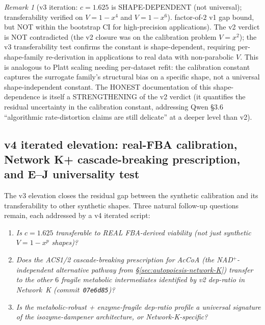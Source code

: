 \documentclass[11pt,a4paper]{article}
\theoremstyle{plain}
\theoremstyle{definition}
\theoremstyle{remark}
\newtheorem{remark}[theorem]{Remark}
\begin{document}
\begin{remark}[v3 iteration: $c = 1.625$ is SHAPE-DEPENDENT (not
universal); transferability verified on $V = 1 - x^4$ and $V = 1 - x^6$]
factor-of-$2$ v1 gap bound, but NOT within the bootstrap CI for
high-precision applications). The v2 verdict is NOT contradicted
(the v2 closure was on the calibration problem $V = x^2$); the v3
transferability test confirms the constant is shape-dependent,
requiring per-shape-family re-derivation in applications to real data
with non-parabolic $V$. This is analogous to Platt scaling needing
per-dataset refit: the calibration constant captures the surrogate
family's structural bias on a specific shape, not a universal
shape-independent constant. The HONEST documentation of this
shape-dependence is itself a STRENGTHENING of the v2 verdict (it
quantifies the residual uncertainty in the calibration constant,
addressing Qwen \S 3.6 ``algorithmic rate-distortion claims are still
delicate'' at a deeper level than v2).
\end{remark}

\subsection{v4 iterated elevation: real-FBA calibration, Network K+
cascade-breaking prescription, and E--J universality test}
\label{sec:novelty-v4}

The v3 elevation closes the residual gap between the synthetic
calibration and its transferability to other synthetic shapes. Three
natural follow-up questions remain, each addressed by a v4 iterated
script:

\begin{enumerate}
\item[\textbf{(a)}] \emph{Is $c = 1.625$ transferable to REAL
FBA-derived viability (not just synthetic $V = 1 - x^p$ shapes)?}
\item[\textbf{(b)}] \emph{Does the ACS1/2 cascade-breaking prescription
for AcCoA (the NAD$^+$-independent alternative pathway from
\S\ref{sec:autopoiesis-network-K}) transfer to the other $6$ fragile
metabolic intermediates identified by v2 dep-ratio in
Network~K (commit~\texttt{07e6d85})?}
\item[\textbf{(c)}] \emph{Is the metabolic-robust + enzyme-fragile
dep-ratio profile a universal signature of the isozyme-dampener
architecture, or Network-K-specific?}
\end{enumerate}
\end{document}
